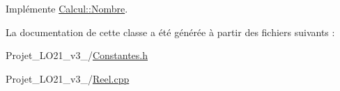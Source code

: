 Implémente \hyperlink{class_calcul_1_1_nombre_a01b0c03ea3d7493e6d853768cce6f096}{Calcul\-::\-Nombre}.



La documentation de cette classe a été générée à partir des fichiers suivants \-:\begin{DoxyCompactItemize}
\item 
Projet\-\_\-\-L\-O21\-\_\-v3\-\_/\hyperlink{_constantes_8h}{Constantes.\-h}\item 
Projet\-\_\-\-L\-O21\-\_\-v3\-\_/\hyperlink{_reel_8cpp}{Reel.\-cpp}\end{DoxyCompactItemize}
